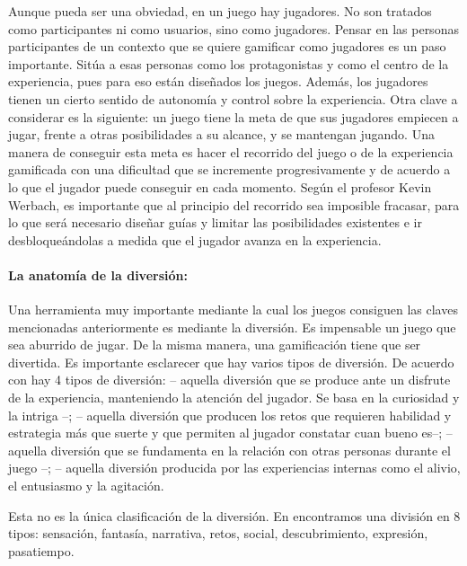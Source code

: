 Aunque pueda ser una obviedad, en un juego hay jugadores. No son tratados como participantes ni como usuarios, sino como jugadores.
%
Pensar en las personas participantes de un contexto que se quiere gamificar como jugadores es un paso importante.
%
Sitúa a esas personas como los protagonistas y como el centro de la experiencia, pues para eso están diseñados los juegos.
%
Además, los jugadores tienen un cierto sentido de autonomía y control sobre la experiencia.
%
Otra clave a considerar es la siguiente: un juego tiene la meta de que sus jugadores empiecen a jugar, frente a otras posibilidades a su alcance, y se mantengan jugando.
%
Una manera de conseguir esta meta es hacer el recorrido del juego o de la experiencia gamificada con una dificultad que se incremente progresivamente y de acuerdo a lo que el jugador puede conseguir en cada momento. 
%
Según el profesor Kevin Werbach, es importante que al principio del recorrido sea imposible fracasar, para lo que será necesario diseñar guías y limitar las posibilidades existentes e ir desbloqueándolas a medida que el jugador avanza en la experiencia.



\paragraph{La anatomía de la diversión: }

Una herramienta muy importante mediante la cual los juegos consiguen las claves mencionadas anteriormente es mediante la diversión.
%
Es impensable un juego que sea aburrido de jugar.
%
De la misma manera, una gamificación tiene que ser divertida.
%
Es importante esclarecer que hay varios tipos de diversión.
%
De acuerdo con \cite{whyweplaygames} hay 4 tipos de diversión: 
%
 -- aquella diversión que se produce ante un disfrute de la experiencia, manteniendo la atención del jugador. Se basa en la curiosidad y la intriga --;
%
\label{kindsoffun}
  -- aquella diversión que producen los retos que requieren habilidad y estrategia más que suerte y que permiten al jugador constatar cuan bueno es--;
%
 -- aquella diversión que se fundamenta en la relación con otras personas durante el juego --;
%
 -- aquella diversión producida por las experiencias internas como el alivio, el entusiasmo y la agitación.

Esta no es la única clasificación de la diversión.
%
En \cite{MDA} encontramos una división en 8 tipos: sensación, fantasía, narrativa, retos, social, descubrimiento, expresión, pasatiempo.
%
\label{AnatomyOfFun}
%

